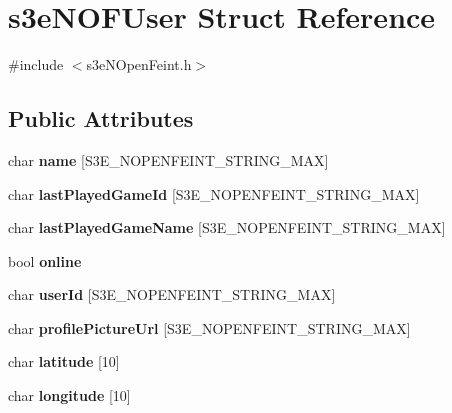 \hypertarget{structs3e_n_o_f_user}{
\section{s3eNOFUser Struct Reference}
\label{structs3e_n_o_f_user}
}


{\ttfamily \#include $<$s3eNOpenFeint.h$>$}

\subsection*{Public Attributes}
\begin{DoxyCompactItemize}
\item 
\hypertarget{structs3e_n_o_f_user_a24033cb0807cd9e8abae3a656de997fd}{
char {\bfseries name} \mbox{[}S3E\_\-NOPENFEINT\_\-STRING\_\-MAX\mbox{]}}
\label{structs3e_n_o_f_user_a24033cb0807cd9e8abae3a656de997fd}

\item 
\hypertarget{group___n_open_feint_api_group_ga006e0fc3783b27c0dcc38b15c238f857}{
char {\bfseries lastPlayedGameId} \mbox{[}S3E\_\-NOPENFEINT\_\-STRING\_\-MAX\mbox{]}}
\label{group___n_open_feint_api_group_ga006e0fc3783b27c0dcc38b15c238f857}

\item 
\hypertarget{group___n_open_feint_api_group_gaa2660e7649786483081b1c907a767591}{
char {\bfseries lastPlayedGameName} \mbox{[}S3E\_\-NOPENFEINT\_\-STRING\_\-MAX\mbox{]}}
\label{group___n_open_feint_api_group_gaa2660e7649786483081b1c907a767591}

\item 
\hypertarget{group___n_open_feint_api_group_gaf2b2516a60a29534aa94fc9f901a629b}{
bool {\bfseries online}}
\label{group___n_open_feint_api_group_gaf2b2516a60a29534aa94fc9f901a629b}

\item 
\hypertarget{group___n_open_feint_api_group_gafd32f1539eaa5e98839c34cef6e40c4a}{
char {\bfseries userId} \mbox{[}S3E\_\-NOPENFEINT\_\-STRING\_\-MAX\mbox{]}}
\label{group___n_open_feint_api_group_gafd32f1539eaa5e98839c34cef6e40c4a}

\item 
\hypertarget{group___n_open_feint_api_group_gac94b3e2f5b51e04bc998cb0e7fc18fe0}{
char {\bfseries profilePictureUrl} \mbox{[}S3E\_\-NOPENFEINT\_\-STRING\_\-MAX\mbox{]}}
\label{group___n_open_feint_api_group_gac94b3e2f5b51e04bc998cb0e7fc18fe0}

\item 
\hypertarget{group___n_open_feint_api_group_ga1cb952b9a174f212cdd38915a12c4560}{
char {\bfseries latitude} \mbox{[}10\mbox{]}}
\label{group___n_open_feint_api_group_ga1cb952b9a174f212cdd38915a12c4560}

\item 
\hypertarget{group___n_open_feint_api_group_gac30e43a59dd4cd87a9c48b2a456367c8}{
char {\bfseries longitude} \mbox{[}10\mbox{]}}
\label{group___n_open_feint_api_group_gac30e43a59dd4cd87a9c48b2a456367c8}

\end{DoxyCompactItemize}


